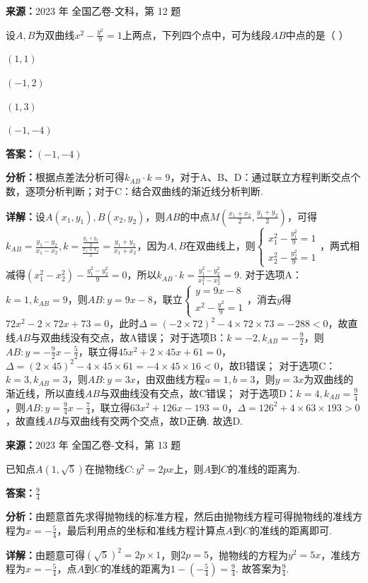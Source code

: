 \begin{question}[points=5]
\textbf{来源：}2023 年 全国乙卷-文科，第 12 题\par
设$A,B$为双曲线$x^2-\frac{y^2}{9}=1$上两点，下列四个点中，可为线段$AB$中点的是（   ）
\begin{choices}
  \item $(1,1)$
  \item $(-1,2)$
  \item $(1,3)$
  \item $(-1,-4)$
\end{choices}
\begin{solution}
\textbf{答案：}$(-1,-4)$

\textbf{分析：}根据点差法分析可得$k_{AB}\cdot k=9$，对于A、B、D：通过联立方程判断交点个数，逐项分析判断；对于C：结合双曲线的渐近线分析判断.

\textbf{详解：}设$A(x_1,y_1), B(x_2,y_2)$，则$AB$的中点$M(\frac{x_1+x_2}{2},\frac{y_1+y_2}{2})$，可得$k_{AB}=\frac{y_1-y_2}{x_1-x_2}, k=\frac{\frac{y_1+y_2}{2}}{\frac{x_1+x_2}{2}}=\frac{y_1+y_2}{x_1+x_2}$，因为$A,B$在双曲线上，则$\begin{cases}x_1^2-\frac{y_1^2}{9}=1\\x_2^2-\frac{y_2^2}{9}=1\end{cases}$，两式相减得$(x_1^2-x_2^2)-\frac{y_1^2-y_2^2}{9}=0$，所以$k_{AB}\cdot k=\frac{y_1^2-y_2^2}{x_1^2-x_2^2}=9$.
对于选项A：$k=1, k_{AB}=9$，则$AB: y=9x-8$，联立$\begin{cases}y=9x-8\\x^2-\frac{y^2}{9}=1\end{cases}$，消去$y$得$72x^2-2\times72x+73=0$，此时$\Delta=(-2\times72)^2-4\times72\times73=-288<0$，故直线$AB$与双曲线没有交点，故A错误；
对于选项B：$k=-2, k_{AB}=-\frac{9}{2}$，则$AB: y=-\frac{9}{2}x-\frac{5}{2}$，联立得$45x^2+2\times45x+61=0$，$\Delta=(2\times45)^2-4\times45\times61=-4\times45\times16<0$，故B错误；
对于选项C：$k=3, k_{AB}=3$，则$AB: y=3x$，由双曲线方程$a=1,b=3$，则$y=3x$为双曲线的渐近线，所以直线$AB$与双曲线没有交点，故C错误；
对于选项D：$k=4, k_{AB}=\frac{9}{4}$，则$AB: y=\frac{9}{4}x-\frac{7}{4}$，联立得$63x^2+126x-193=0$，$\Delta=126^2+4\times63\times193>0$，故直线$AB$与双曲线有交两个交点，故D正确. 故选D.
\end{solution}
\end{question}

\begin{question}[points=5]
\textbf{来源：}2023 年 全国乙卷-文科，第 13 题\par
已知点$A(1,\sqrt{5})$在抛物线$C: y^2=2px$上，则$A$到$C$的准线的距离为.
\fillin[{$\frac{9}{4}$}]
\begin{solution}
\textbf{答案：}$\frac{9}{4}$

\textbf{分析：}由题意首先求得抛物线的标准方程，然后由抛物线方程可得抛物线的准线方程为$x=-\frac{5}{4}$，最后利用点的坐标和准线方程计算点$A$到$C$的准线的距离即可.

\textbf{详解：}由题意可得$(\sqrt{5})^2=2p\times1$，则$2p=5$，抛物线的方程为$y^2=5x$，准线方程为$x=-\frac{5}{4}$，点$A$到$C$的准线的距离为$1-(-\frac{5}{4})=\frac{9}{4}$. 故答案为$\frac{9}{4}$.
\end{solution}
\end{question}

